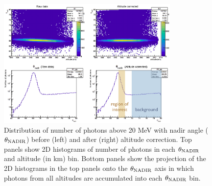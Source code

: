 \begin{figure}[h!]
    \centering
    \includegraphics[width=0.8\textwidth]{content/result_and_discussion/figures/LATShifted_v3.png}
    \caption{
        Distribution of number of photons above 20 MeV with nadir angle
        ($\theta_{\rm NADIR}$) before (left) and after (right)
        altitude correction.
        Top panels show 2D histograms of number of photons in
        each $\theta_{\rm NADIR}$ and altitude (in km) bin.
        Bottom panels show the projection of the 2D histograms
        in the top panels onto the $\theta_{\rm NADIR}$ axis
        in which photons from all altitudes are accumulated
        into each $\theta_{\rm NADIR}$ bin.
    }
    \label{fig:lat_nadir_shifted}
\end{figure}


